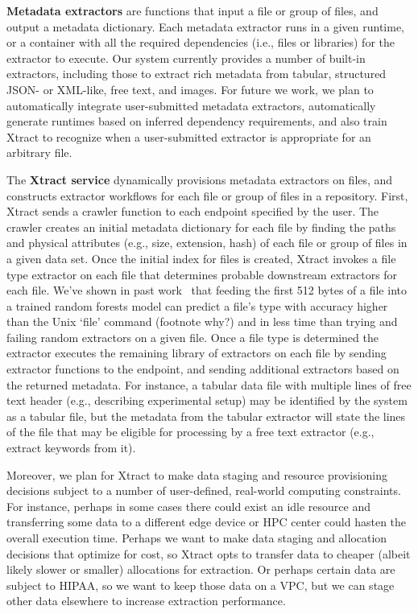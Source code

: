 \documentclass[sigconf, 9pt]{acmart}
\newcommand{\name}{Xtract}
\begin{document}
\textbf{Metadata extractors} are functions that input a file or group of files, and output a metadata dictionary. 
Each metadata extractor runs in a given runtime, or a container with all the required dependencies (i.e., files or 
libraries) for the extractor to execute.  Our system currently provides a number of built-in extractors, including
those to extract rich metadata from tabular, structured JSON- or XML-like, free text, and images. For future we work, 
we plan to automatically integrate user-submitted metadata extractors, automatically generate runtimes based on inferred 
dependency requirements, and also train \name{} to recognize when a user-submitted extractor 
is appropriate for an arbitrary file. 

The \textbf{\name{} service} dynamically provisions metadata extractors on files, and constructs extractor workflows for each file 
or group of files in a repository.  First, \name{} sends a crawler function to each endpoint specified by the user.  The crawler creates an 
initial metadata dictionary for each file by finding the paths and physical attributes (e.g., size, extension, hash) of each file or group of files
in a given data set.  Once the initial index for files is created, \name{} invokes a file type extractor on each file that determines probable downstream extractors for each file. We've shown in past work~\cite{skluzacek2018skluma} that feeding the first 512 bytes of a file into 
a trained random forests model can predict a file's type with accuracy higher than the Unix `file' command (footnote why?) and in less time
than trying and failing random extractors on a given file. Once a file type is determined the extractor executes the remaining library of extractors 
on each file by sending extractor functions to the endpoint, and sending additional extractors based on the returned metadata.  For instance, 
a tabular data file with multiple lines of free text header (e.g., describing experimental setup) may be identified by the system as a tabular file, but 
the metadata from the tabular 
extractor will state the lines of the file that may be eligible for processing by a free text extractor (e.g., extract keywords from it).  

Moreover, we 
plan for \name{} to make data staging and resource provisioning decisions subject to a number of user-defined, real-world computing constraints. For instance, 
perhaps in some cases there could exist an idle resource and transferring some data to a different edge device or HPC center could hasten 
the overall execution time.  Perhaps we want to make data staging and allocation decisions that optimize for cost, so \name{} opts to transfer 
data to cheaper (albeit likely slower or smaller) allocations for extraction.  Or perhaps certain data are subject to HIPAA, so we want to keep 
those data on a VPC, but we can stage other data elsewhere to increase extraction performance. 
\end{document}
